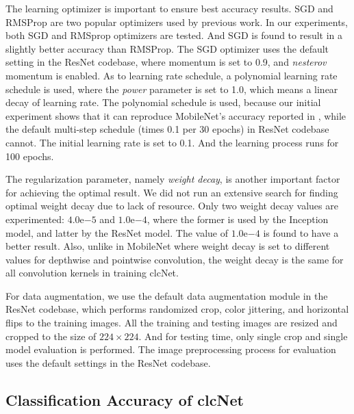 \documentclass[10pt,twocolumn,letterpaper]{article}
\begin{document}
The learning optimizer is important to ensure best accuracy results.  SGD and RMSProp\cite{rmsprop2012tieleman} are two popular optimizers used by previous work. In our experiments, both SGD and RMSprop optimizers are tested. And SGD is found to result in a slightly better accuracy than RMSProp. The SGD optimizer uses the default setting in the ResNet codebase, where momentum is set to 0.9, and \textit{nesterov} momentum is enabled. As to learning rate schedule, a polynomial learning rate schedule is used, where the \textit{power} parameter is set to 1.0, which means a linear decay of learning rate. The polynomial schedule is used, because our initial experiment shows that it can reproduce MobileNet's accuracy reported in \cite{mobilenet2017howard}, while the default multi-step schedule (times 0.1 per 30 epochs) in ResNet codebase cannot. The initial learning rate is set to 0.1. And the learning process runs for 100 epochs. 

The regularization parameter, namely \textit{weight decay}, is another important factor for achieving the optimal result. We did not run an extensive search for finding optimal weight decay due to lack of resource. Only two weight decay values are experimented: $4.0\mathrm{e}{-5}$ and $1.0\mathrm{e}{-4}$, where the former is used by the Inception model\cite{inception2015szegedy}, and latter by the ResNet model\cite{resnet2016he}.  The value of $1.0\mathrm{e}{-4}$ is found to have a better result. Also, unlike in MobileNet where weight decay is set to different values for depthwise and pointwise convolution, the weight decay is the same for all convolution kernels in training clcNet.

For data augmentation, we use the default data augmentation module in the ResNet codebase, which performs randomized crop, color jittering, and horizontal flips to the training images. All the training and testing images are resized and cropped to the size of $224\times{224}$. And for testing time, only single crop and single model evaluation is performed. The image preprocessing process for evaluation uses the default settings in the ResNet codebase. 

\subsection{Classification Accuracy of clcNet}
\end{document}
